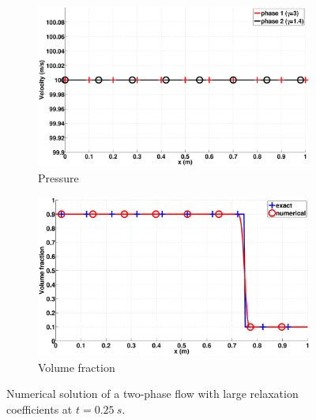 \documentclass[preprint,10pt]{elsarticle}
\begin{document}
\begin{figure}[H]
        \begin{subfigure}[b]{0.495\textwidth}
                \centering
                \includegraphics[width=\textwidth]{figures/liquid_velocity.eps}
                \caption{Pressure}
                \label{fig:adv-vf-press}
        \end{subfigure}        
        \begin{subfigure}[b]{0.495\textwidth}
                \centering
                \includegraphics[width=\textwidth]{figures/advection-vol-fraction.eps}
                \caption{Volume fraction}
                \label{fig:adv-vf-vf}
        \end{subfigure}
        \caption{Numerical solution of a two-phase flow with large relaxation coefficients at $t=0.25 \ s$.}\label{fig:adv-vf-variables}
\end{figure}
%
\end{document}
